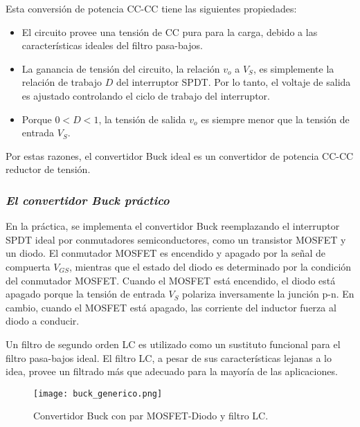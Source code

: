 Esta conversión de potencia CC-CC tiene las siguientes propiedades:
\begin{itemize}[noitemsep]
    \item El circuito provee una tensión de CC pura para la carga, debido a las características ideales del filtro pasa-bajos.
    \item La ganancia de tensión del circuito, la relación $v_o$ a $V_S$, es simplemente la relación de trabajo $D$ del interruptor SPDT. Por lo tanto, el voltaje de salida
    es ajustado controlando el ciclo de trabajo del interruptor.
    \item Porque $0 < D < 1$, la tensión de salida $v_o$ es siempre menor que la tensión de entrada $V_S$.
\end{itemize}

Por estas razones, el convertidor Buck ideal es un convertidor de potencia CC-CC reductor de tensión.

\subsubsection*{\it{El convertidor Buck práctico}}
\vspace{-0.25cm}
En la práctica, se implementa el convertidor Buck reemplazando el interruptor SPDT ideal por conmutadores semiconductores, como un transistor MOSFET y un diodo.
El conmutador MOSFET es encendido y apagado por la señal de compuerta $V_{GS}$, mientras que el estado del diodo es determinado por la condición del conmutador MOSFET.
Cuando el MOSFET está encendido, el diodo está apagado porque la tensión de entrada $V_S$ polariza inversamente la junción p-n. En cambio, cuando el MOSFET está apagado,
las corriente del inductor fuerza al diodo a conducir.

Un filtro de segundo orden LC es utilizado como un sustituto funcional para el filtro pasa-bajos ideal. El filtro LC, a pesar de sus características lejanas a lo idea, provee
un filtrado más que adecuado para la mayoría de las aplicaciones.

\begin{figure}[H]
    \centering
    \texttt{[image: buck\_generico.png]}
    \vspace{-0.25cm}
    \caption{Convertidor Buck con par MOSFET-Diodo y filtro LC.}
    \label{fig:buck_practico}
\end{figure}
\vspace{-0.5cm}
\parencite{CHOI} %